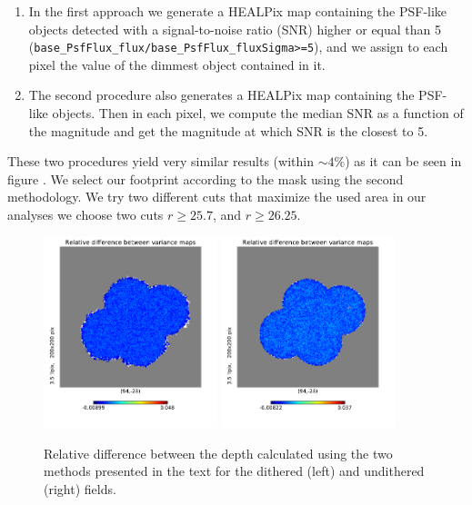 \documentclass[\docopts]{\docclass}
\begin{document}
\begin{enumerate}
\item In the first approach we generate a HEALPix\citep{2005ApJ...622..759G} map containing the PSF-like objects detected with a signal-to-noise ratio (SNR) higher or equal than 5 (\texttt{base\_PsfFlux\_flux/base\_PsfFlux\_fluxSigma>=5}), and we assign to each pixel the value of the
dimmest object contained in it.
\item The second procedure also generates a HEALPix\citep{2005ApJ...622..759G} map containing the PSF-like objects. Then in each pixel, we compute the median SNR as a function of the magnitude and get the magnitude at which SNR is the closest to 5.
\end{enumerate}

These two procedures yield very similar results (within $\sim 4\%$) as it can be seen in figure . We select our footprint according to the mask using the second methodology. We try two different cuts that maximize the used area
in our analyses we choose two cuts $r \geq 25.7$, and $r \geq 26.25$.

\begin{figure}
\centering
\includegraphics[width=0.45\textwidth]{imsim_dithered_depth_difference.pdf}
\includegraphics[width=0.45\textwidth]{imsim_undithered_depth_difference.pdf}
\caption{Relative difference between the depth calculated using the two methods presented in the text for the dithered (left) and undithered (right) fields.}
\label{fig:depth_comparison}
\end{figure}
\end{document}
